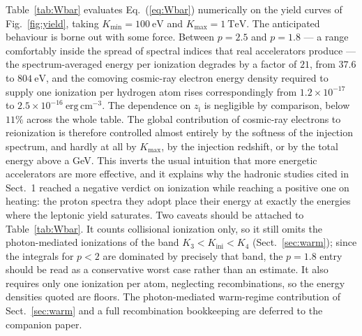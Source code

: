\documentclass[twocolumn]{article}
\newcommand{\Kini}{K_{\mathrm{ini}}}
\newcommand{\zi}{z_{\mathrm{i}}}
\begin{document}
Table~\ref{tab:Wbar} evaluates Eq.~(\ref{eq:Wbar}) numerically on the yield
curves of Fig.~\ref{fig:yield}, taking $K_{\min} = 100\ \mathrm{eV}$ and
$K_{\max} = 1\ \mathrm{TeV}$. The
anticipated behaviour is borne out with some force. Between $p = 2.5$ and
$p = 1.8$ --- a range comfortably inside the spread of spectral indices that
real accelerators produce --- the spectrum-averaged energy per ionization
degrades by a factor of $21$, from $37.6$ to $804\ \mathrm{eV}$, and the
comoving cosmic-ray electron energy density required to supply one ionization
per hydrogen atom rises correspondingly from
$1.2\times10^{-17}$ to $2.5\times10^{-16}\ \mathrm{erg\,cm^{-3}}$. The
dependence on $\zi$ is negligible by comparison, below $11\%$ across the whole
table.
The global contribution of cosmic-ray electrons to reionization is therefore
controlled almost entirely by the softness of the injection spectrum, and
hardly at all by $K_{\max}$, by the injection redshift, or by the total energy
above a GeV. This inverts the usual intuition that more energetic accelerators
are more effective, and it explains why the hadronic studies cited in Sect.~1
reached a negative verdict on ionization while reaching a positive one on
heating: the proton spectra they adopt place their energy at exactly the
energies where the leptonic yield saturates. Two caveats should be attached to
Table~\ref{tab:Wbar}. It counts collisional ionization only, so it still omits
the photon-mediated ionizations of the band $K_3 < \Kini < K_4$
(Sect.~\ref{sec:warm}); since the integrals for $p < 2$ are dominated by
precisely that band, the $p = 1.8$ entry should be read as a conservative
worst case rather than an estimate. It also requires only one ionization per
atom, neglecting recombinations, so the energy densities quoted are floors. The photon-mediated warm-regime
contribution of Sect.~\ref{sec:warm} and a full recombination bookkeeping are
deferred to the companion paper.
\end{document}
